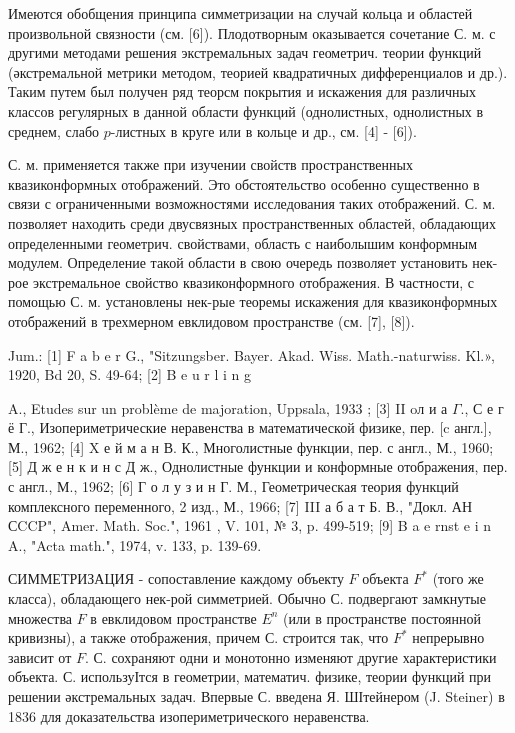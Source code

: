 \documentclass[10pt]{article}
\begin{document}
Имеются обобщения принципа симметризации на случай кольца и областей произвольной связности (см. [6]). Плодотворным оказывается сочетание С. м. с другими методами решения экстремальных задач геометрич. теории функций (әкстремальной метрики методом, теорией квадратичных дифференциалов и др.). Таким путем был получен ряд теорсм покрытия и искажения для различных классов регулярных в данной области функций (однолистных, однолистных в среднем, слабо $p$-листных в круге или в кольце и др., см. [4] - [6]).



С. м. применяется также при изучении свойств пространственных квазиконформных отображений. Это обстоятельство особенно существенно в связи с ограниченными возможностями исследования таких отображений. С. м. позволяет находить среди двусвязных пространственных областей, обладающих определенными геометрич. свойствами, область с наиболышим конформным модулем. Определение такой области в свою очередь позволяет установить нек-рое экстремальное свойство квазиконформного отображения. В частности, с помощью С. м. установлены нек-рые теоремы искажения для квазиконформных отображений в трехмерном евклидовом пространстве (см. [7], [8]).



Jum.: [1] F a b e r G., "Sitzungsber. Bayer. Akad. Wiss. Math.-naturwiss. Kl.», 1920, Bd 20, S. 49-64; [2] B e u r l i n g

A., Etudes sur un problème de majoration, Uppsala, 1933 ; [3] II oл и а $\Gamma .$, С е г ё Г., Изопериметрические неравенства в математической физике, пер. [c англ.], М., 1962; [4] X е й м а н В. К., Многолистные функции, пер. с англ., М., 1960; [5] Д ж е н к и н с Д ж., Однолистные функции и конформные отображения, пер. с англ., М., 1962; [6] Г о л у з и н Г. М., Геометрическая теория функций комплексного переменного, 2 изд., М., 1966; [7] III а б а т Б. В., "Докл. АН СCCP", Amer. Math. Soc.", 1961 , V. 101, № 3, p. 499-519; [9] B a e rnst e i n A., "Acta math.", 1974, v. 133, p. 139-69.



СИММЕТРИЗАЦИЯ - сопоставление каждому объекту $F$ объекта $F^{*}$ (того же класса), обладающего нек-рой симметрией. Обычно С. подвергают замкнутые множества $F$ в евклидовом пространстве $E^{n}$ (или в пространстве постоянной кривизны), а также отображения, причем С. строится так, что $F^{*}$ непрерывно зависит от $F$. С. сохраняют одни и монотонно изменяют другие характеристики объекта. С. используІтся в геометрии, математич. физике, теории функций при решении әкстремальных задач. Впервые С. введена Я. ШІтейнером (J. Steiner) в 1836 для доказательства изопериметрического неравенства.
\end{document}
